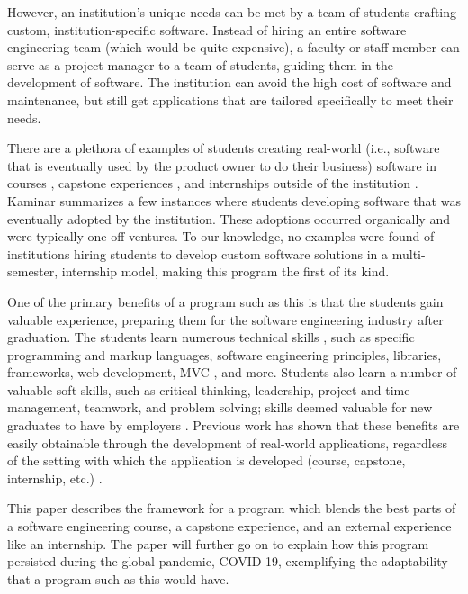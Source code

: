 However, an institution's unique needs can be met by a team of students crafting custom, institution-specific software. Instead of hiring an entire software engineering team (which would be quite expensive), a faculty or staff member can serve as a project manager to a team of students, guiding them in the development of software. The institution can avoid the high cost of software and maintenance, but still get applications that are tailored specifically to meet their needs.

There are a plethora of examples of students creating real-world (i.e., software that is eventually used by the product owner to do their business) software in courses \cite{coursevsproject, tadayon2004software}, capstone experiences \cite{keogh2007scalable, capstone}, and internships outside of the institution \cite{rochesterfirstundergradsoftwareteam}. Kaminar \cite{kaminer_2014} summarizes a few instances where students developing software that was eventually adopted by the institution. These adoptions occurred organically and were typically one-off ventures. To our knowledge, no examples were found of institutions hiring students to develop custom software solutions in a multi-semester, internship model, making this program the first of its kind.

One of the primary benefits of a program such as this is that the students gain valuable experience, preparing them for the software engineering industry after graduation. The students learn numerous technical skills \cite{hardskills}, such as specific programming and markup languages, software engineering principles, libraries, frameworks, web development, MVC \cite{mvc}, and more. Students also learn a number of valuable soft skills, such as critical thinking, leadership, project and time management, teamwork, and problem solving; skills deemed valuable for new graduates to have by employers \cite{lavy2013soft}. Previous work has shown that these benefits are easily obtainable through the development of real-world applications, regardless of the setting with which the application is developed (course, capstone, internship, etc.) \cite{heggen2018hiring, liu2005enriching, alzamil2005towards}.

This paper describes the framework for a program which blends the best parts of a software engineering course, a capstone experience, and an external experience like an internship. The paper will further go on to explain how this program persisted during the global pandemic, COVID-19, exemplifying the adaptability that a program such as this would have.
